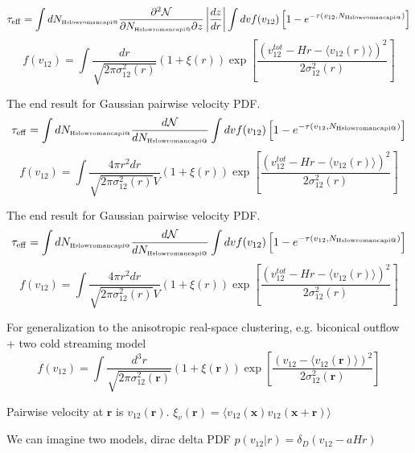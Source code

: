 \documentclass[useAMS,usenatbib,twocolumn]{mn2e}
\makeatletter
\newcommand{\Rmnum}[1]{\expandafter\@slowromancap\romannumeral #1@}
\newcommand{\NHI}{N_{\mbox{\tiny H\Rmnum{1}}}}
\makeatother
\begin{document}
\begin{equation}
\tau_{\rm{eff}}=\int d\NHI\frac{\partial^2\mathcal{N}}{\partial\NHI\partial z}
\left|\frac{dz}{dr}\right|
\int dv f(v_{12})\left[1-e^{-\tau(v_{12},\NHI)}\right]
\end{equation}
\begin{equation}
f(v_{12})=\int \frac{dr}{\sqrt{2\pi\sigma_{12}^2(r)}}
\left(1+\xi(r)\right)
\exp\left[\frac{(v_{12}^{tot}-Hr-\langle v_{12}(r)\rangle)^2}
{2\sigma_{12}^2(r)}\right]
\end{equation}



The end result for Gaussian pairwise velocity PDF.
\begin{equation}
\tau_{\rm{eff}}=\int d\NHI\frac{d\mathcal{N}}{d\NHI}
\int dv f(v_{12})\left[1-e^{-\tau(v_{12},\NHI)}\right]
\end{equation}
\begin{equation}
f(v_{12})=\int \frac{4\pi r^2dr}{\sqrt{2\pi\sigma_{12}^2(r)}V}
\left(1+\xi(r)\right)
\exp\left[\frac{(v_{12}^{tot}-Hr-\langle v_{12}(r)\rangle)^2}
{2\sigma_{12}^2(r)}\right]
\end{equation}


The end result for Gaussian pairwise velocity PDF.
\begin{equation}
\tau_{\rm{eff}}=\int d\NHI\frac{d\mathcal{N}}{d\NHI}
\int dv f(v_{12})\left[1-e^{-\tau(v_{12},\NHI)}\right]
\end{equation}
\begin{equation}
f(v_{12})=\int \frac{4\pi r^2dr}{\sqrt{2\pi\sigma_{12}^2(r)}V}
\left(1+\xi(r)\right)
\exp\left[\frac{(v_{12}^{tot}-Hr-\langle v_{12}(r)\rangle)^2}
{2\sigma_{12}^2(r)}\right]
\end{equation}

For generalization to the anisotropic real-space clustering, e.g.
biconical outflow + two cold streaming model
\begin{equation}
f(v_{12})=\int \frac{d^3r}{\sqrt{2\pi\sigma_{12}^2(\boldsymbol{r})}}
\left(1+\xi(\boldsymbol{r})\right)
\exp\left[\frac{(v_{12}-\langle v_{12}(\boldsymbol{r})\rangle)^2}
{2\sigma_{12}^2(\boldsymbol{r})}\right]
\end{equation}

Pairwise velocity at $\boldsymbol{r}$ is $v_{12}(\boldsymbol{r})$.
$\xi_v(\boldsymbol{r})=\langle v_{12}(\boldsymbol{x})
v_{12}(\boldsymbol{x}+\boldsymbol{r})\rangle$

We can imagine two models, dirac delta PDF $p(v_{12}|r)=\delta_D(v_{12}-aHr)$
\end{document}
